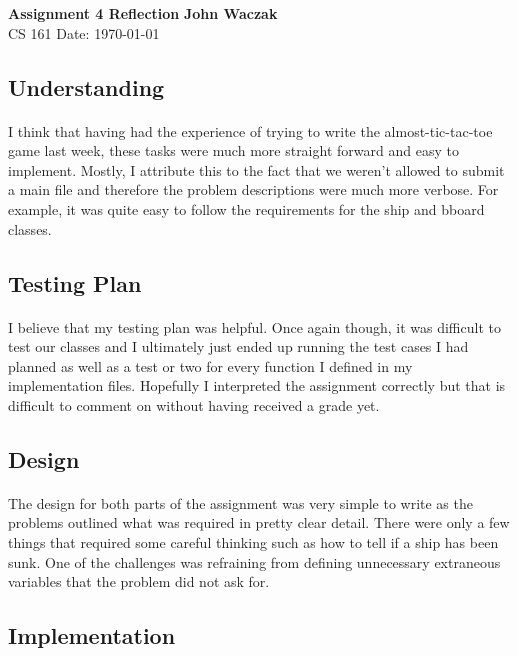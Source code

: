 \documentclass[a4paper, 11pt]{article}
\begin{document}
\noindent
\large\textbf{Assignment 4 Reflection} \hfill \textbf{John Waczak} \\
\normalsize CS 161 \hfill  Date: \today \\

\subsection*{Understanding}
	\paragraph{}
	I think that having had the experience of trying to write the almost-tic-tac-toe game last week, these tasks were much more straight forward and easy to implement. Mostly, I attribute this to the fact that we weren't allowed to submit a main file and therefore the problem descriptions were much more verbose. For example, it was quite easy to follow the requirements for the ship and bboard classes.  
	
\subsection*{Testing Plan}
	\paragraph{}
	I believe that my testing plan was helpful. Once again though, it was difficult to test our classes and I ultimately just ended up running the test cases I had planned as well as a test or two for every function I defined in my implementation files. Hopefully I interpreted the assignment correctly but that is difficult to comment on without having received a grade yet. 

\subsection*{Design}
	\paragraph{}
	The design for both parts of the assignment was very simple to write as the problems outlined what was required in pretty clear detail. There were only a few things that required some careful thinking such as how to tell if a ship has been sunk. One of the challenges was refraining from defining unnecessary extraneous variables that the problem did not ask for. 
\subsection*{Implementation} 
\end{document}
